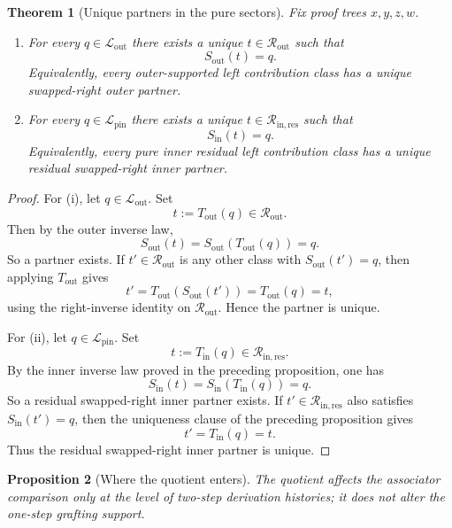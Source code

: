 \documentclass[11pt]{article}
\newtheorem{theorem}{Theorem}
\newtheorem{proposition}[theorem]{Proposition}
\begin{document}
\begin{theorem}[Unique partners in the pure sectors]
Fix proof trees \(x,y,z,w\).
\begin{enumerate}[label=\textup{(\roman*)}]
\item For every \(q\in \mathcal L_{\mathrm{out}}\) there exists a unique
\(t\in \mathcal R_{\mathrm{out}}\) such that
\[
S_{\mathrm{out}}(t)=q.
\]
Equivalently, every outer-supported left contribution class has a unique
swapped-right outer partner.
\item For every \(q\in \mathcal L_{\mathrm{pin}}\) there exists a unique
\(t\in \mathcal R_{\mathrm{in,res}}\) such that
\[
S_{\mathrm{in}}(t)=q.
\]
Equivalently, every pure inner residual left contribution class has a unique
residual swapped-right inner partner.
\end{enumerate}
\end{theorem}

\begin{proof}
For \textup{(i)}, let \(q\in \mathcal L_{\mathrm{out}}\). Set
\[
t:=T_{\mathrm{out}}(q)\in \mathcal R_{\mathrm{out}}.
\]
Then by the outer inverse law,
\[
S_{\mathrm{out}}(t)=S_{\mathrm{out}}(T_{\mathrm{out}}(q))=q.
\]
So a partner exists. If \(t'\in \mathcal R_{\mathrm{out}}\) is any other class
with \(S_{\mathrm{out}}(t')=q\), then applying \(T_{\mathrm{out}}\) gives
\[
t'=T_{\mathrm{out}}(S_{\mathrm{out}}(t'))=T_{\mathrm{out}}(q)=t,
\]
using the right-inverse identity on \(\mathcal R_{\mathrm{out}}\). Hence the
partner is unique.

For \textup{(ii)}, let \(q\in \mathcal L_{\mathrm{pin}}\). Set
\[
t:=T_{\mathrm{in}}(q)\in \mathcal R_{\mathrm{in,res}}.
\]
By the inner inverse law proved in the preceding proposition, one has
\[
S_{\mathrm{in}}(t)=S_{\mathrm{in}}(T_{\mathrm{in}}(q))=q.
\]
So a residual swapped-right inner partner exists. If
\(t'\in \mathcal R_{\mathrm{in,res}}\) also satisfies \(S_{\mathrm{in}}(t')=q\),
then the uniqueness clause of the preceding proposition gives
\[
t'=T_{\mathrm{in}}(q)=t.
\]
Thus the residual swapped-right inner partner is unique.
\end{proof}

\begin{proposition}[Where the quotient enters]
The quotient affects the associator comparison only at the level of
\emph{two-step derivation histories}; it does not alter the \emph{one-step}
grafting support.
\end{proposition}
\end{document}
